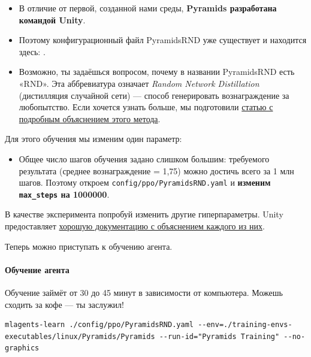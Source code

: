 \documentclass[11pt,a4paper]{article}
\begin{document}
\begin{itemize}
\tightlist
\item
  В отличие от первой, созданной нами среды, \textbf{Pyramids разработана командой Unity}.
\item
  Поэтому конфигурационный файл PyramidsRND уже существует и находится здесь: .
\item
  Возможно, ты задаёшься вопросом, почему в названии PyramidsRND есть «RND». Эта аббревиатура означает \emph{Random Network Distillation} (дистилляция случайной сети) --- способ генерировать вознаграждение за любопытство. Если хочется узнать больше, мы подготовили \href{https://medium.com/data-from-the-trenches/curiosity-driven-learning-through-random-network-distillation-488ffd8e5938}{статью с подробным объяснением этого метода}.
\end{itemize}

Для этого обучения мы изменим один параметр:

\begin{itemize}
\tightlist
\item
  Общее число шагов обучения задано слишком большим: требуемого результата (среднее вознаграждение = 1,75) можно достичь всего за 1 млн шагов. Поэтому откроем \texttt{config/ppo/PyramidsRND.yaml} и \textbf{изменим \texttt{max\_steps} на 1000000}.
\end{itemize}


В качестве эксперимента попробуй изменить другие гиперпараметры. Unity предоставляет \href{https://github.com/Unity-Technologies/ml-agents/blob/main/docs/Training-Configuration-File.md}{хорошую документацию с объяснением каждого из них}.

Теперь можно приступать к обучению агента.

\paragraph{Обучение агента}\label{train-the-agent-1}

Обучение займёт от 30 до 45 минут в зависимости от компьютера. Можешь сходить за кофе --- ты заслужил!

\begin{lstlisting}
mlagents-learn ./config/ppo/PyramidsRND.yaml --env=./training-envs-executables/linux/Pyramids/Pyramids --run-id="Pyramids Training" --no-graphics
\end{lstlisting}
\end{document}
